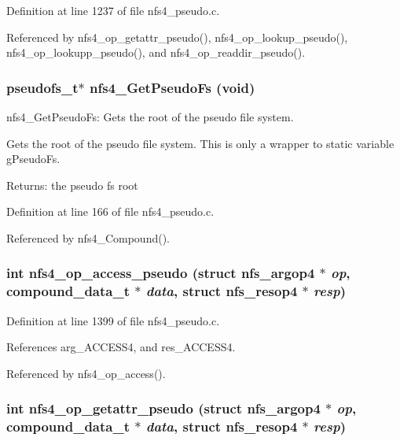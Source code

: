 Definition at line 1237 of file nfs4\_\-pseudo.c.

Referenced by nfs4\_\-op\_\-getattr\_\-pseudo(), nfs4\_\-op\_\-lookup\_\-pseudo(), nfs4\_\-op\_\-lookupp\_\-pseudo(), and nfs4\_\-op\_\-readdir\_\-pseudo().
\subsubsection{\setlength{\rightskip}{0pt plus 5cm}pseudofs\_\-t$\ast$ nfs4\_\-Get\-Pseudo\-Fs (void)}\label{nfs4__pseudo_8c_a16}


nfs4\_\-Get\-Pseudo\-Fs: Gets the root of the pseudo file system.

Gets the root of the pseudo file system. This is only a wrapper to static variable g\-Pseudo\-Fs.

\begin{Desc}
\item[Returns:]the pseudo fs root \end{Desc}


Definition at line 166 of file nfs4\_\-pseudo.c.

Referenced by nfs4\_\-Compound().
\subsubsection{\setlength{\rightskip}{0pt plus 5cm}int nfs4\_\-op\_\-access\_\-pseudo (struct nfs\_\-argop4 $\ast$ {\em op}, compound\_\-data\_\-t $\ast$ {\em data}, struct nfs\_\-resop4 $\ast$ {\em resp})}\label{nfs4__pseudo_8c_a23}




Definition at line 1399 of file nfs4\_\-pseudo.c.

References arg\_\-ACCESS4, and res\_\-ACCESS4.

Referenced by nfs4\_\-op\_\-access().
\subsubsection{\setlength{\rightskip}{0pt plus 5cm}int nfs4\_\-op\_\-getattr\_\-pseudo (struct nfs\_\-argop4 $\ast$ {\em op}, compound\_\-data\_\-t $\ast$ {\em data}, struct nfs\_\-resop4 $\ast$ {\em resp})}\label{nfs4__pseudo_8c_a22}




